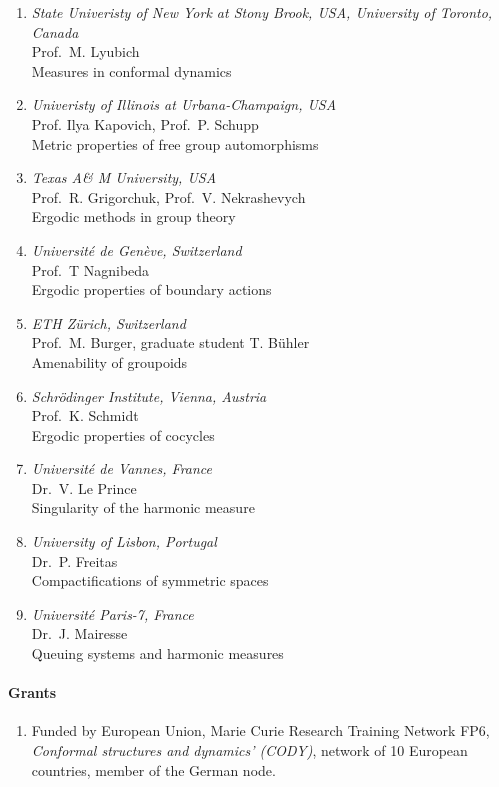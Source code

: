 \begin{enumerate}
\item {\sl State Univeristy of New York at Stony Brook, USA, University of
Toronto, Canada} \\
Prof.~M. Lyubich \\
Measures in conformal dynamics

\item {\sl Univeristy of Illinois at Urbana-Champaign, USA} \\ Prof. Ilya Kapovich,
Prof.~P. Schupp\\
Metric properties of free group automorphisms

\item {\sl Texas A\& M University, USA} \\
Prof.~R. Grigorchuk, Prof.~V. Nekrashevych\\
Ergodic methods in group theory

\item {\sl Universit\'e de Gen\`eve, Switzerland} \\
Prof.~T Nagnibeda \\
Ergodic properties of boundary actions

\item {\sl ETH Z\"urich, Switzerland}\\
Prof.~M. Burger, graduate student T. B\"uhler \\
Amenability of groupoids

\item {\sl Schr\"{o}dinger Institute, Vienna, Austria}\\
Prof.~K. Schmidt \\
Ergodic properties of cocycles

\item{\sl Universit\'e de Vannes, France}\\
Dr.~V. Le Prince \\
Singularity of the harmonic measure

\item{\sl University of Lisbon, Portugal}\\
Dr.~P. Freitas \\
Compactifications of symmetric spaces

\item{\sl Universit\'e Paris-7, France}\\
Dr.~J. Mairesse \\
Queuing systems and harmonic measures
\end{enumerate}



\paragraph{Grants}
\begin{enumerate}
\item Funded by European Union, Marie Curie Research Training
Network FP6, \emph{Conformal structures and dynamics' (CODY)},
network of 10 European countries, member of the German node.
\end{enumerate}

\nocite{Kaimanovich1}\nocite{Kaimanovich2} \nocite{Kaimanovich3}
